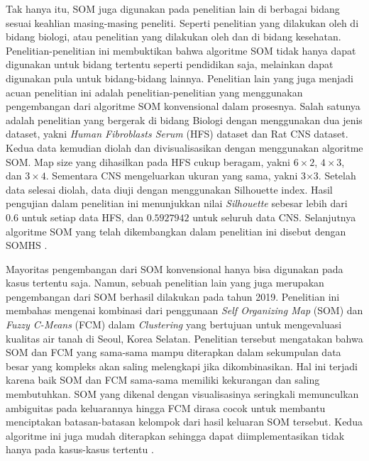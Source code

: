 Tak hanya itu, SOM juga digunakan pada penelitian lain di berbagai bidang sesuai  keahlian  masing-masing  peneliti.  Seperti  penelitian  yang  dilakukan  oleh \citet{Oliver2018} di bidang biologi, atau penelitian yang dilakukan oleh \citet{Pisano2017} dan \citet{MolinaGarcia2019} di bidang kesehatan. Penelitian-penelitian  ini membuktikan bahwa algoritme SOM tidak hanya dapat digunakan untuk bidang tertentu seperti pendidikan saja, melainkan dapat digunakan pula untuk bidang-bidang lainnya.
Penelitian  lain  yang  juga  menjadi  acuan  penelitian  ini  adalah  penelitian-penelitian yang menggunakan pengembangan dari algoritme SOM konvensional dalam prosesnya. Salah satunya adalah penelitian yang bergerak di bidang Biologi dengan menggunakan dua jenis dataset, yakni \textit{Human Fibroblasts Serum} (HFS) dataset dan Rat CNS dataset. Kedua data kemudian diolah dan divisualisasikan dengan menggunakan algoritme SOM. Map size yang dihasilkan pada HFS cukup beragam, yakni $6×2$, $4×3$, dan $3×4$. Sementara CNS mengeluarkan ukuran yang sama, yakni 3×3. Setelah data selesai diolah, data diuji dengan menggunakan Silhouette index. Hasil pengujian dalam penelitian ini menunjukkan nilai \textit{Silhouette} sebesar lebih dari 0.6 untuk setiap data HFS, dan $0.5927942$ untuk seluruh data CNS. Selanjutnya algoritme SOM yang telah dikembangkan dalam penelitian ini disebut dengan SOMHS \citep{George2015}. 

Mayoritas pengembangan dari SOM konvensional hanya bisa digunakan pada kasus tertentu saja. Namun, sebuah penelitian lain yang juga merupakan pengembangan dari SOM berhasil dilakukan pada tahun 2019. Penelitian ini membahas mengenai kombinasi dari penggunaan \textit{Self Organizing Map} (SOM) dan \textit{Fuzzy C-Means} (FCM) dalam \textit{Clustering} yang bertujuan untuk mengevaluasi kualitas air tanah di Seoul, Korea Selatan. Penelitian tersebut  mengatakan bahwa SOM dan FCM yang sama-sama mampu diterapkan dalam sekumpulan data besar yang kompleks akan saling melengkapi jika dikombinasikan. Hal ini terjadi karena baik SOM dan FCM sama-sama memiliki kekurangan dan saling membutuhkan. SOM yang dikenal dengan visualisasinya seringkali memunculkan ambiguitas pada keluarannya hingga FCM dirasa  cocok untuk  membantu  menciptakan batasan-batasan  kelompok  dari  hasil keluaran SOM tersebut. Kedua algoritme ini juga mudah diterapkan sehingga dapat  diimplementasikan tidak hanya pada kasus-kasus  tertentu \citep{Lee2019}.


